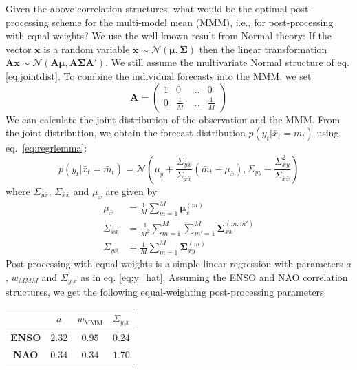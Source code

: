 \documentclass[12pt]{article}
\renewcommand{\vec}[1]{\bm{#1}}
\newcommand{\mat}[1]{\bm{#1}}
\begin{document}
Given the above correlation structures, what would be the optimal post-processing scheme for the multi-model mean (MMM), i.e., for post-processing with equal weights?
We use the well-known result from Normal theory: If the vector $\vec{x}$ is a random variable $\vec{x}\sim \mathcal{N}(\vec{\mu}, \mat{\Sigma})$ then the linear transformation $\mat{A}\vec{x} \sim \mathcal{N}(\mat{A}\vec{\mu}, \mat{A}\mat{\Sigma}\mat{A}')$.
We still assume the multivariate Normal structure of eq. \ref{eq:jointdist}.
To combine the individual forecasts into the MMM, we set
%
\begin{equation}
\mat{A} = \left(\begin{matrix} 1 & 0 & \dots & 0 \\ 0 & \frac1M & \dots & \frac1M\end{matrix}\right)
\end{equation}
%
We can calculate the joint distribution of the observation and the MMM. 
From the joint distribution, we obtain the forecast distribution $p(y_t | \bar{x}_t = m_t)$ using eq.~\ref{eq:regrlemma}:
%
\begin{equation}
p(y_t|\bar{x}_t = \bar{m}_t) = \mathcal{N}\left(\mu_y + \frac{\Sigma_{y\bar{x}}}{\Sigma_{\bar{x}\bar{x}}} (\bar{m}_t - \mu_{\bar{x}}), \Sigma_{yy} - \frac{\Sigma_{\bar{x}y}^2}{\Sigma_{\bar{x}\bar{x}}}\right)
\end{equation}
%
where $\Sigma_{y\bar{x}}$, $\Sigma_{\bar{x}\bar{x}}$ and $\mu_{\bar{x}}$ are given by 
%
\begin{align}
\mu_{\bar{x}} & = \frac1M \sum_{m=1}^M \vec{\mu}_x^{(m)}\\
\Sigma_{\bar{x}\bar{x}} & = \frac{1}{M^2}\sum_{m=1}^M\sum_{m'=1}^M \mat{\Sigma}_{xx}^{(m,m')} \\
\Sigma_{y\bar{x}} & = \frac1M \sum_{m=1}^M \mat{\Sigma}_{xy}^{(m)}
\end{align}
%
Post-processing with equal weights is a simple linear regression with parameters $a$, $w_{MMM}$ and $\Sigma_{y|x}$ as in eq. \ref{eq:y_hat}.
Assuming the ENSO and NAO correlation structures, we get the following equal-weighting post-processing parameters 
%
\begin{center}
\begin{tabular}{c|ccc}
& $a$ & $w_{\mathrm{MMM}}$ & $\Sigma_{y|x}$ \\
\hline
\textbf{ENSO} & $2.32$ & $0.95$ & $0.24$ \\
\textbf{NAO} & $0.34$ & $0.34$ & $1.70$ 
\end{tabular}
\end{center}
\end{document}
